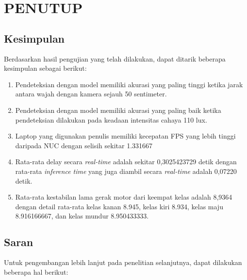 \chapter{PENUTUP}
\label{chap:penutup}


\section{Kesimpulan}
\label{sec:kesimpulan}

Berdasarkan hasil pengujian yang telah dilakukan, dapat ditarik beberapa kesimpulan sebagai berikut:

\begin{enumerate}[nolistsep]

  \item Pendeteksian dengan model memiliki akurasi yang paling tinggi ketika jarak antara wajah dengan kamera sejauh 50 sentimeter.  

  \item Pendeteksian dengan model memiliki akurasi yang paling baik ketika pendeteksian dilakukan pada keadaan intensitas cahaya 110 lux.

  \item Laptop yang digunakan penulis memiliki kecepatan FPS yang lebih tinggi daripada NUC dengan selisih sekitar 1.331667
  
  \item Rata-rata delay secara \emph{real-time} adalah sekitar 0,3025423729 detik dengan rata-rata \emph{inference time} yang juga diambil secara \emph{real-time} adalah 0,07220 detik.
  
  \item Rata-rata kestabilan lama gerak motor dari keempat kelas adalah 8,9364 dengan detail rata-rata kelas kanan 8.945, kelas kiri 8.934, kelas maju 8.916166667, dan kelas mundur 8.950433333. 


\end{enumerate}



\section{Saran}
\label{chap:saran}

Untuk pengembangan lebih lanjut pada penelitian selanjutnya, dapat dilakukan beberapa hal berikut:

